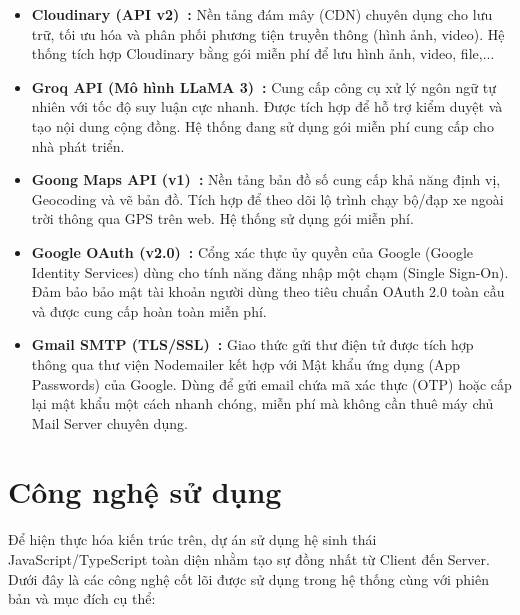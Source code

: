 \begin{itemize}[leftmargin=1.5em]
    \item \textbf{Cloudinary (API v2)~\cite{CloudinaryDocs}:} Nền tảng đám mây (CDN) chuyên dụng cho lưu trữ, tối ưu hóa và phân phối phương tiện truyền thông (hình ảnh, video). Hệ thống tích hợp Cloudinary bằng gói miễn phí để lưu hình ảnh, video, file,...
    
    \item \textbf{Groq API (Mô hình LLaMA 3)~\cite{GroqDocs}:} Cung cấp công cụ xử lý ngôn ngữ tự nhiên với tốc độ suy luận cực nhanh. Được tích hợp để hỗ trợ kiểm duyệt và tạo nội dung cộng đồng. Hệ thống đang sử dụng gói miễn phí cung cấp cho nhà phát triển.
    
    \item \textbf{Goong Maps API (v1)~\cite{GoongMapsAPI}:} Nền tảng bản đồ số cung cấp khả năng định vị, Geocoding và vẽ bản đồ. Tích hợp để theo dõi lộ trình chạy bộ/đạp xe ngoài trời thông qua GPS trên web. Hệ thống sử dụng gói miễn phí.
    
    \item \textbf{Google OAuth (v2.0)~\cite{GoogleOAuth}:} Cổng xác thực ủy quyền của Google (Google Identity Services) dùng cho tính năng đăng nhập một chạm (Single Sign-On). Đảm bảo bảo mật tài khoản người dùng theo tiêu chuẩn OAuth 2.0 toàn cầu và được cung cấp hoàn toàn miễn phí.
    
    \item \textbf{Gmail SMTP (TLS/SSL)~\cite{NodemailerDocs}:} Giao thức gửi thư điện tử được tích hợp thông qua thư viện Nodemailer kết hợp với Mật khẩu ứng dụng (App Passwords) của Google. Dùng để gửi email chứa mã xác thực (OTP) hoặc cấp lại mật khẩu một cách nhanh chóng, miễn phí mà không cần thuê máy chủ Mail Server chuyên dụng.
\end{itemize}

\section{Công nghệ sử dụng}
\label{sec:tech_stack}

Để hiện thực hóa kiến trúc trên, dự án sử dụng hệ sinh thái JavaScript/TypeScript toàn diện nhằm tạo sự đồng nhất từ Client đến Server. Dưới đây là các công nghệ cốt lõi được sử dụng trong hệ thống cùng với phiên bản và mục đích cụ thể:

